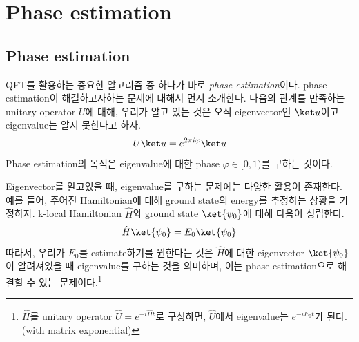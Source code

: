 \section{Phase estimation}\label{sec:QPE}
\subsection{Phase estimation}
QFT를 활용하는 중요한 알고리즘 중 하나가 바로 \textit{phase estimation}이다. phase estimation이 해결하고자하는 문제에 대해서 먼저 소개한다.
다음의 관계를 만족하는 unitary operator $U$에 대해, 우리가 알고 있는 것은 오직 eigenvector인 $\ket u$이고 eigenvalue는 알지 못한다고 하자.
\begin{equation*}
  U \ket u = e^{2\pi i \varphi} \ket u
\end{equation*}
Phase estimation의 목적은 eigenvalue에 대한 phase $\varphi \in [0, 1)$를 구하는 것이다.

Eigenvector를 알고있을 때, eigenvalue를 구하는 문제에는 다양한 활용이 존재한다. 예를 들어, 주어진 Hamiltonian에 대해 ground state의 energy를 추정하는 상황을 가정하자. k-local Hamiltonian $\hat H$와 ground state $\ket{\psi_0}$에 대해 다음이 성립한다.
\begin{equation*}
  \hat H \ket{\psi_0} = E_0 \ket{\psi_0}
\end{equation*}
따라서, 우리가 $E_0$를 estimate하기를 원한다는 것은 $\hat H$에 대한 eigenvector $\ket{\psi_0}$이 알려져있을 때 eigenvalue를 구하는 것을 의미하며, 이는 phase estimation으로 해결할 수 있는 문제이다.\footnote{$\hat H$를 unitary operator $\hat U = e^{-i\hat H t}$로 구성하면, $\hat U$에서 eigenvalue는 $e^{-i E_0 t}$가 된다. (with matrix exponential)}

\newpage


